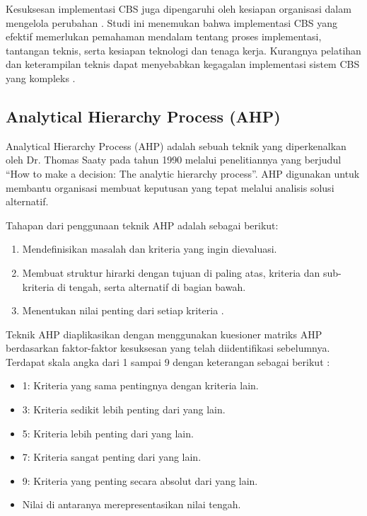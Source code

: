 \documentclass[journal,article,submit,pdftex,moreauthors]{Definitions/mdpi}
\begin{document}
Kesuksesan implementasi CBS juga dipengaruhi oleh kesiapan organisasi dalam mengelola perubahan \cite{johny-csf}. Studi ini menemukan bahwa implementasi CBS yang efektif memerlukan pemahaman mendalam tentang proses implementasi, tantangan teknis, serta kesiapan teknologi dan tenaga kerja. Kurangnya pelatihan dan keterampilan teknis dapat menyebabkan kegagalan implementasi sistem CBS yang kompleks \cite{johny-csf}.

\subsection{Analytical Hierarchy Process (AHP)}
Analytical Hierarchy Process (AHP) adalah sebuah teknik yang diperkenalkan oleh Dr. Thomas Saaty pada tahun 1990 melalui penelitiannya yang berjudul “How to make a decision: The analytic hierarchy process”. AHP digunakan untuk membantu organisasi membuat keputusan yang tepat melalui analisis solusi alternatif. 

Tahapan dari penggunaan teknik AHP adalah sebagai berikut:
\begin{enumerate}
    \item Mendefinisikan masalah dan kriteria yang ingin dievaluasi.
    \item Membuat struktur hirarki dengan tujuan di paling atas, kriteria dan sub-kriteria di tengah, serta alternatif di bagian bawah.
    \item Menentukan nilai penting dari setiap kriteria \cite{Jacob2021}.
\end{enumerate}

Teknik AHP diaplikasikan dengan menggunakan kuesioner matriks AHP berdasarkan faktor-faktor kesuksesan yang telah diidentifikasi sebelumnya. Terdapat skala angka dari 1 sampai 9 dengan keterangan sebagai berikut \cite{Saaty1990}:
\begin{itemize}
    \item 1: Kriteria yang sama pentingnya dengan kriteria lain.
    \item 3: Kriteria sedikit lebih penting dari yang lain.
    \item 5: Kriteria lebih penting dari yang lain.
    \item 7: Kriteria sangat penting dari yang lain.
    \item 9: Kriteria yang penting secara absolut dari yang lain.
    \item Nilai di antaranya merepresentasikan nilai tengah.
\end{itemize}
\end{document}
